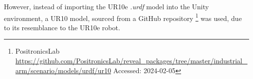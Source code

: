     However, instead of importing the UR10e \textit{.urdf} model into the Unity environment, a UR10 model, sourced from a GitHub repository \footnote{PositronicsLab \url{https://github.com/PositronicsLab/reveal_packages/tree/master/industrial_arm/scenario/models/urdf/ur10} Accessed: 2024-02-05} 
    was used, due to its resemblance to the UR10e robot. 







